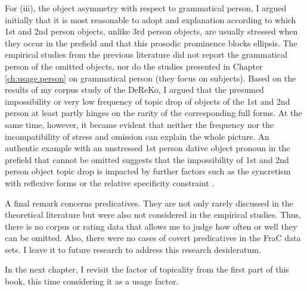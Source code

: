 For (iii), the object asymmetry with respect to grammatical person, I argued initially that it is most reasonable to adopt  and  explanation according to which 1st and 2nd person objects, unlike 3rd person objects, are usually stressed when they occur in the prefield and that this prosodic  prominence blocks ellipsis.
The empirical studies from the previous literature did not report the grammatical person of the omitted objects, nor do the studies presented in Chapter \ref{ch:usage.person} on grammatical person (they focus on subjects).
Based on the results of my corpus study of the DeReKo, I argued that the presumed impossibility or very low frequency of topic drop of objects of the 1st and 2nd person at least partly hinges on the rarity of the corresponding full forms.
At the same time, however, it became evident that neither the frequency nor the incompatibility of stress and omission can explain the whole picture.
An authentic example with an unstressed 1st person dative  object pronoun in the prefield that cannot be omitted suggests that the impossibility of 1st and 2nd person object topic drop is impacted by further factors such as the syncretism  with reflexive forms \citep{fries1988} or the relative specificity constraint \citep{sigurdsson2011}.

A final remark concerns predicatives.
They are not only rarely discussed in the theoretical literature but were also not considered in the empirical studies.
Thus, there is no corpus or rating data that allows me to judge how often or well they can be omitted.
Also, there were no cases of covert predicatives in the FraC data sets.
I leave it to future research to address this research desideratum. 

In the next chapter, I revisit the factor of topicality from the first part of this book, this time considering it as a usage factor.
 
